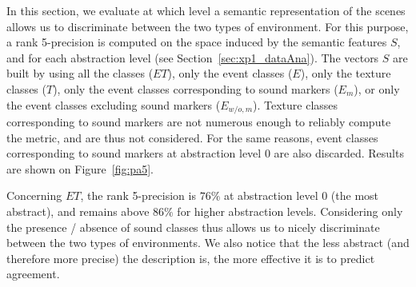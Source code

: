 \documentclass[12pt]{elsarticle}
\newcommand{\ie}{\emph{i.\,e.}}
\newcommand{\cf}{cf.}
\begin{document}
In this section, we evaluate at which level a semantic representation of the scenes allows us to discriminate between the two types of environment. For this purpose, a rank 5-precision is computed on the space induced by the semantic features $S$, and for each abstraction level (see Section~\ref{sec:xp1_dataAna}). The vectors $S$ are built by using all the classes ($ET$), only the event classes ($E$), only the texture classes ($T$), only the event classes corresponding to sound markers ($E_m$), or only the event classes excluding sound markers ($E_{w/o,m}$). Texture classes corresponding to sound markers are not numerous enough to reliably compute the metric, and are thus not considered. For the same reasons, event classes corresponding to sound markers at abstraction level $0$ are also discarded. Results are shown on Figure~\ref{fig:pa5}.


Concerning $ET$, the rank 5-precision is $76\%$ at abstraction level $0$ (the most abstract), and remains above $86\%$ for higher abstraction levels. Considering only the presence / absence of sound classes thus allows us to nicely discriminate between the two types of environments. We also notice that the less abstract (and therefore more precise) the description is, the more effective it is to predict agreement.

\end{document}

